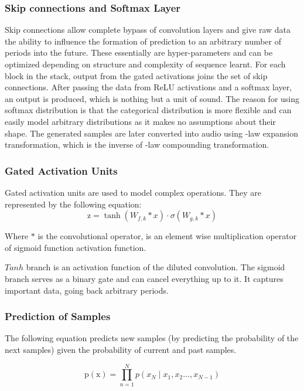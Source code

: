 \documentclass[runningheads]{llncs}
\begin{document}
\subsubsection{Skip connections and Softmax Layer} 
Skip connections allow complete bypass of convolution layers and give raw data the ability to influence the formation of prediction to an arbitrary number of periods into the future. These essentially are hyper-parameters and can be optimized depending on structure and complexity of sequence learnt. For each block in the stack, output from the gated activations joins the set of skip connections. After passing the data from ReLU activations and a softmax layer, an output is produced, which is nothing but a unit of sound. The reason for using softmax distribution is that the categorical distribution is more flexible and can easily model arbitrary distributions as it makes no assumptions about their shape. The generated samples are later converted into audio using -law expansion transformation, which is the inverse of -law compounding transformation. 

\subsubsection{Gated Activation Units}
Gated activation units are used to model complex operations. They are represented by the following equation:
\begin{equation}
\mathrm{z}=\tanh \left(W_{f, k} * x\right) \cdot \sigma\left(W_{g, k} * x\right)
\end{equation}

Where $*$ is the convolutional operator, is an element wise multiplication operator of sigmoid function activation function. 

$Tanh$ branch is an activation function of the diluted convolution. The sigmoid branch serves as a binary gate and can cancel everything up to it. It captures important data, going back arbitrary periods. 

\subsubsection{Prediction of Samples}
The following equation predicts new samples (by predicting the probability of the next samples) given the probability of current and past samples.

\begin{equation}
\mathrm{p}(\mathrm{x})=\prod_{n=1}^{N} p\left(x_{N} \mid x_{1}, x_{2} \ldots, x_{N-1}\right)
\end{equation}
\end{document}
